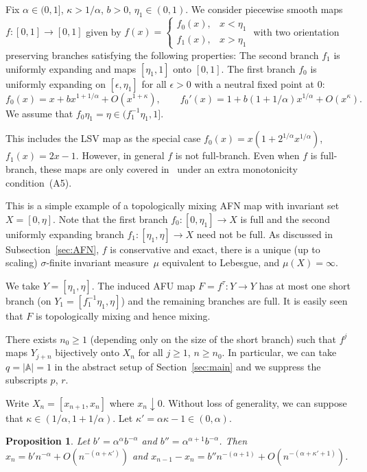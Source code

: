 \documentclass[12pt]{article}
\numberwithin{equation}{section}
\newtheorem{prop}[thm]{Proposition}
\newcommand{\bbA}{{\mathbb A}}
\newcommand{\eps}{\epsilon}
\begin{document}
\begin{example} \label{ex:2branch}
Fix $\alpha\in(0,1]$, $\kappa>1/\alpha$, $b>0$, $\eta_1\in(0,1)$.
We consider piecewise smooth maps $f:[0,1]\to [0,1]$ given by
$f(x)=\begin{cases} f_0(x), & x<\eta_1 \\ f_1(x), & x>\eta_1\end{cases}$
with two orientation preserving branches satisfying the following properties:
The second branch $f_1$ is uniformly expanding and maps $[\eta_1,1]$ onto $[0,1]$.
The first branch $f_0$ is uniformly expanding on $[\eps,\eta_1]$ for all $\eps>0$ with a neutral fixed point at $0$:
\[
f_0(x)=x + b x^{1+1/\alpha}+O(x^{1+\kappa}), \qquad
f_0'(x)=1 + b(1+1/\alpha)x^{1/\alpha}+O(x^\kappa).
\]
We assume that $f_0\eta_1=\eta \in (f_1^{-1}\eta_1,1]$.

\begin{rmk}
This includes the LSV map as the special case $f_0(x)=x(1+2^{1/\alpha}x^{1/\alpha})$, $f_1(x)=2x-1$. However, in general $f$ is not full-branch.
Even when $f$ is full-branch, these maps are only covered in~\cite{BonannoLenci21} under an extra monotonicity condition~(A5).
\end{rmk}

This is a simple example of a topologically mixing AFN map with invariant set $X=[0,\eta]$.
Note that the first branch $f_0:[0,\eta_1]\to X$ is full and the second uniformly expanding branch $f_1:[\eta_1,\eta]\to X$ need not be full.
As discussed in Subsection~\ref{sec:AFN}, $f$ is conservative and exact, there is a unique (up to scaling) $\sigma$-finite invariant measure~$\mu$ equivalent to Lebesgue, and $\mu(X)=\infty$.

We take $Y=[\eta_1,\eta]$.  The induced AFU map $F=f^\tau:Y\to Y$ has at most one short branch (on 
$Y_1=[f_1^{-1}\eta_1,\eta]$) and the remaining branches are full.
It is easily seen that $F$ is topologically mixing and hence mixing.

There exists $n_0\ge1$ (depending only on the size of the short branch) such that
$f^j$ maps $Y_{j+n}$ bijectively onto
$X_n$ for all $j\ge1$, $n\ge n_0$.
In particular, we can take $q=|\bbA|=1$ in the abstract setup of Section~\ref{sec:main} and we suppress the subscripts $p$, $r$.

Write $X_n=[x_{n+1},x_n]$ where $x_n\downarrow0$.
Without loss of generality, we can suppose that $\kappa\in(1/\alpha,1+1/\alpha)$.
Let $\kappa'=\alpha\kappa-1\in(0,\alpha)$.

\begin{prop} \label{prop:xn}
Let $b'=\alpha^\alpha b^{-\alpha}$ and $b''=\alpha^{\alpha+1}b^{-\alpha}$.
Then
$x_n=  b' n^{-\alpha}+O(n^{-(\alpha+\kappa')})$
and $x_{n-1}-x_n= b'' n^{-(\alpha+1)}+O(n^{-(\alpha+\kappa'+1)})$.
\end{prop}


\end{example}
\end{document}
